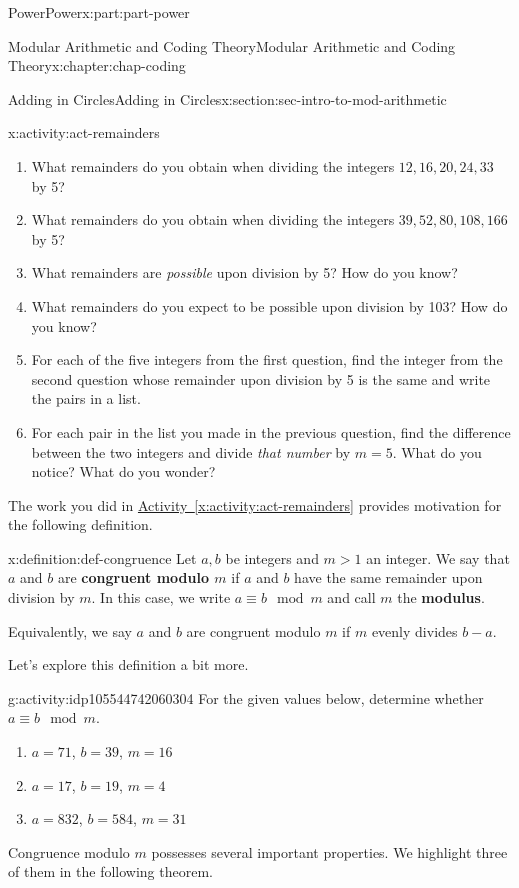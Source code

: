 \documentclass[oneside,10pt,]{book}
\newcommand{\xreffont}{\relax}
\newcommand{\terminology}[1]{\textbf{#1}}
\numberwithin{equation}{section}
\newcommand{\gt}{>}
\begin{document}
\begin{partptx}{Power}{}{Power}{}{}{x:part:part-power}
\begin{chapterptx}{Modular Arithmetic and Coding Theory}{}{Modular Arithmetic and Coding Theory}{}{}{x:chapter:chap-coding}
\begin{sectionptx}{Adding in Circles}{}{Adding in Circles}{}{}{x:section:sec-intro-to-mod-arithmetic}
\begin{activity}{}{x:activity:act-remainders}
%
\begin{enumerate}
\item{}What remainders do you obtain when dividing the integers \(12, 16, 20, 24, 33\) by 5?%
\item{}What remainders do you obtain when dividing the integers \(39, 52, 80, 108, 166\) by 5?%
\item{}What remainders are \emph{possible} upon division by 5? How do you know?%
\item{}What remainders do you expect to be possible upon division by 103? How do you know?%
\item{}For each of the five integers from the first question, find the integer from the second question whose remainder upon division by 5 is the same and write the pairs in a list.%
\item{}For each pair in the list you made in the previous question, find the difference between the two integers and divide \emph{that number} by \(m=5\). What do you notice? What do you wonder?%
\end{enumerate}
\end{activity}%
The work you did in \hyperref[x:activity:act-remainders]{Activity~{\xreffont\ref{x:activity:act-remainders}}} provides motivation for the following definition.%
\begin{definition}{}{x:definition:def-congruence}%
%
%
Let \(a,b\) be integers and \(m \gt 1\) an integer. We say that \(a\) and \(b\) are \terminology{congruent modulo \(m\)} if \(a\) and \(b\) have the same remainder upon division by \(m\). In this case, we write \(a\equiv b\mod m\) and call \(m\) the \terminology{modulus}.%
\par
Equivalently, we say \(a\) and \(b\) are congruent modulo \(m\) if \(m\) evenly divides \(b-a\).%
\end{definition}
Let's explore this definition a bit more.%
\begin{activity}{}{g:activity:idp105544742060304}%
For the given values below, determine whether \(a \equiv b\mod m\).%
%
\begin{enumerate}
\item{}\(a = 71\), \(b = 39\), \(m= 16\)%
\item{}\(a = 17\), \(b = 19\), \(m = 4\)%
\item{}\(a = 832\), \(b = 584\), \(m= 31\)%
\end{enumerate}
\end{activity}%
Congruence modulo \(m\) possesses several important properties. We highlight three of them in the following theorem.%

\end{sectionptx}
\end{chapterptx}
\end{partptx}
\end{document}
